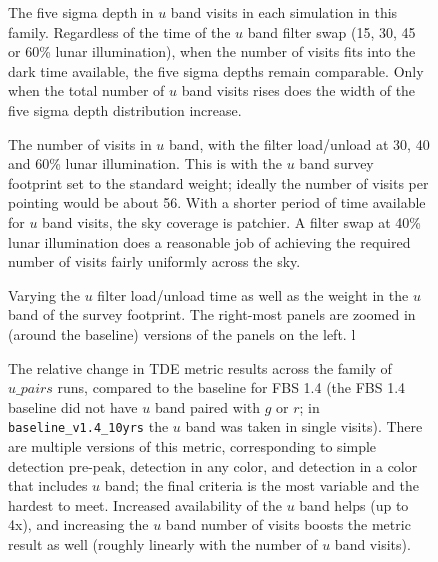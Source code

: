 \begin{figure}
\caption{The five sigma depth in $u$ band visits in each simulation in this family. Regardless of the time of the $u$ band filter swap (15, 30, 45 or 60\% lunar illumination), when the number of visits fits into the dark time available, the five sigma depths remain comparable. Only when the total number of $u$ band visits rises does the width of the five sigma depth distribution increase.}
\label{fig:u_band_fiveSigmaDepth}
\end{figure}

\begin{figure}
\caption{The number of visits in $u$ band, with the filter load/unload at 30, 40 and 60\% lunar illumination. This is with the $u$ band survey footprint set to the standard weight; ideally the number of visits per pointing would be about 56. With a shorter period of time available for $u$ band visits, the sky coverage is patchier. A filter swap at 40\% lunar illumination does a reasonable job of achieving the required number of visits fairly uniformly across the sky.}
\label{fig:nvisits_ubandswap}
\end{figure}

\begin{figure}
\caption{Varying the $u$ filter load/unload time as well as the weight in the $u$ band of the survey footprint. The right-most panels are zoomed in (around the baseline) versions of the panels on the left. l }
\label{fig:radar_ubandswap}
\end{figure}

\begin{figure}
\caption{The relative change in TDE metric results across the family of $u\_pairs$ runs, compared to the baseline for FBS 1.4 (the FBS 1.4 baseline did not have $u$ band paired with $g$ or $r$; in {\tt baseline\_v1.4\_10yrs} the $u$ band was taken in single visits). There are multiple versions of this metric, corresponding to simple detection pre-peak, detection in any color, and detection in a color that includes $u$ band; the final criteria is the most variable and the hardest to meet. Increased availability of the $u$ band helps (up to 4x), and increasing the $u$ band number of visits boosts the metric result as well (roughly linearly with the number of $u$ band visits).}
\label{fig:upairs_TDE}
\end{figure}


